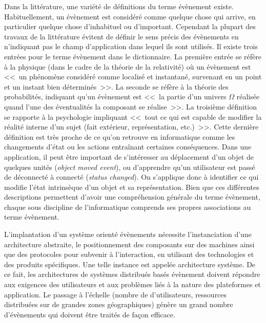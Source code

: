 Dans la littérature, une variété de définitions du terme évènement existe. 
Habituellement, un évènement est considéré comme quelque chose qui 
\og arrive\fg{}, en particulier quelque chose d'inhabituel ou d'important. 
Cependant la plupart des travaux de la littérature évitent de définir le sens précis 
des évènements en n'indiquant pas le champ d'application dans lequel ils sont 
utilisés. 
Il existe trois entrées pour le terme évènement dans le dictionnaire. 
La première entrée se réfère à la physique (dans le cadre de la théorie 
de la relativité) où un évènement est <<~un phénomène considéré comme localisé 
et instantané, survenant en un point et un instant bien déterminés~>>. La seconde 
se réfère à la théorie des probabilités,  indiquant qu'un évènement est <<~la partie 
d'un univers $\Omega$ réalisée quand l'une des éventualités la composant se 
réalise~>>. La troisième définition se rapporte à la psychologie impliquant <<~tout 
ce qui est capable de modifier la réalité interne d'un sujet (fait extérieur, 
représentation, etc.)~>>. Cette dernière définition est très proche de ce qu'on 
retrouve en informatique comme les changements d'état ou les actions entraînant 
certaines conséquences. Dans une application, il peut être important de 
s'intéresser au déplacement d'un objet de quelques unités (\textit{object moved 
	event}), ou d'apprendre qu'un utilisateur est passé de déconnecté à connecté 
(\textit{status changed}). On s'applique donc à identifier ce qui modifie l'état 
intrinsèque d'un objet et sa représentation. Bien que ces différentes descriptions 
permettent d'avoir une compréhension générale du terme évènement, chaque sous 
discipline de l'informatique comprends 
ses propres associations au terme évènement.

L'implantation d'un système orienté évènements nécessite l'instanciation d'une 
architecture abstraite, 
le positionnement des composants sur des machines ainsi que des protocoles 
pour subvenir à l'interaction, en utilisant des technologies et des produits 
spécifiques. Une telle instance est appelée architecture système. De ce fait, les 
architectures de systèmes distribués basés évènement doivent 
répondre aux exigences des utilisateurs et aux problèmes liés à la nature des 
plateformes et application. 
Le passage à l'échelle (nombre de d'utilisateurs, ressources distribuées sur de 
grandes zones géographiques) génère un grand nombre d'évènements qui doivent 
être traités de façon efficace. 

